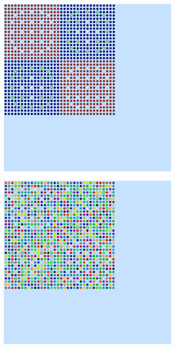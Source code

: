 \begin{figure}[h!]
\centering
\begin{subfigure}{0.33\textwidth}
  \centering
  \includegraphics[width=0.9\linewidth]{figures/reflector/geometry}
  \caption{}
  \label{fig:null-reflector}
\end{subfigure}
\begin{subfigure}{0.33\textwidth}
  \centering
  \includegraphics[width=0.9\linewidth]{figures/reflector/degenerate-materials}

\end{subfigure}
\end{figure}
